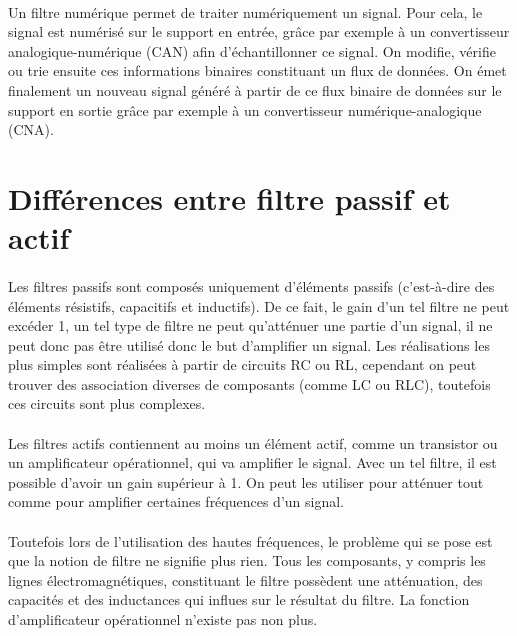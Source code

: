 \documentclass[a4paper,11pt]{article}
\begin{document}
    \paragraph{}
Un filtre numérique permet de traiter numériquement un signal.
Pour cela, le signal est numérisé sur le support en entrée, grâce par exemple à un convertisseur analogique-numérique (CAN) afin d’échantillonner ce signal.
On modifie, vérifie ou trie ensuite ces informations binaires constituant un flux de données.
On émet finalement un nouveau signal généré à partir de ce flux binaire de données sur le support en sortie grâce par exemple à un convertisseur numérique-analogique (CNA).

    \clearpage

\section{Différences entre filtre passif et actif}
    \paragraph{}
Les filtres passifs sont composés uniquement d’éléments passifs (c’est-à-dire des éléments résistifs, capacitifs et inductifs).
De ce fait, le gain d’un tel filtre ne peut excéder 1, un tel type de filtre ne peut qu’atténuer une partie d’un signal, il ne peut donc pas être utilisé donc le but d’amplifier un signal.
Les réalisations les plus simples sont réalisées à partir de circuits RC ou RL, cependant on peut trouver des association diverses de composants (comme LC ou RLC), toutefois ces circuits sont plus complexes.
    \paragraph{}
Les filtres actifs contiennent au moins un élément actif, comme un transistor ou un amplificateur opérationnel, qui va amplifier le signal.
Avec un tel filtre, il est possible d’avoir un gain supérieur à 1.
On peut les utiliser pour atténuer tout comme pour amplifier certaines fréquences d’un signal.
    \paragraph{}
Toutefois lors de l’utilisation des hautes fréquences, le problème qui se pose est que la notion de filtre ne signifie plus rien.
Tous les composants, y compris les lignes électromagnétiques, constituant le filtre possèdent une atténuation, des capacités et des inductances qui influes sur le résultat du filtre.
La fonction d’amplificateur opérationnel n’existe pas non plus.
\end{document}
